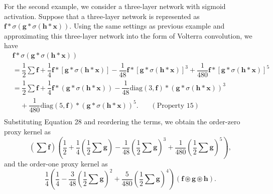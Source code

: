 \documentclass[twoside,11pt]{article}
\def\oconv{\circledast}
\def\diag{\text{diag}}
\def\tvar#1{\mathbf{#1}} %
\begin{document}
For the second example, we consider a three-layer network with sigmoid activation. Suppose that a three-layer network is represented as \(\tvar{f} * \sigma(\tvar{g} * \sigma(\tvar{h} * \tvar{x}))\).
Using the same settings as previous example and approximating this three-layer network into the form of Volterra convolution, we have
\begin{equation*}
  \begin{aligned}
     & \tvar{f} * \sigma(\tvar{g} * \sigma(\tvar{h} * \tvar{x}))                      \\
     & = \dfrac{1}{2} \sum \tvar{f}
    + \dfrac{1}{4} \tvar{f} * [\tvar{g} * \sigma(\tvar{h} * \tvar{x})]
    - \dfrac{1}{48} \tvar{f} * [\tvar{g} * \sigma(\tvar{h} * \tvar{x})]^{3}
    + \dfrac{1}{480} \tvar{f} * [\tvar{g} * \sigma(\tvar{h} * \tvar{x})]^{5}          \\
     & = \dfrac{1}{2} \sum \tvar{f}
    + \dfrac{1}{4} \tvar{f} * (\tvar{g} * \sigma(\tvar{h} * \tvar{x}))
    - \dfrac{1}{48} \diag(3, \tvar{f}) * (\tvar{g} * \sigma(\tvar{h} * \tvar{x}))^{3} \\
     & ~~~~~
    + \dfrac{1}{480} \diag(5, \tvar{f}) * (\tvar{g} * \sigma(\tvar{h} * \tvar{x}))^{5}.
    ~~~~~~~~ (\text{Property 15})
    \\
  \end{aligned}
\end{equation*}
Substituting Equation 28 %
and reordering the terms, we obtain the order-zero proxy kernel as
\begin{equation*}
  \left(\sum \tvar{f} \right)
  \left(
  \dfrac{1}{2}
  + \dfrac{1}{4} \left(\dfrac{1}{2} \sum \tvar{g}\right)
  - \dfrac{1}{48} \left(\dfrac{1}{2} \sum \tvar{g}\right)^3
  + \dfrac{1}{480} \left(\dfrac{1}{2} \sum \tvar{g}\right)^5
  \right),
\end{equation*}
and the order-one proxy kernel as
\begin{equation}
  \label{equ:three-layer-order-one-proxy-kernel}
  \dfrac{1}{4}
  \left(
  \dfrac{1}{4}
  - \dfrac{3}{48} \left(\dfrac{1}{2} \sum \tvar{g}\right)^2
  + \dfrac{5}{480} \left(\dfrac{1}{2} \sum \tvar{g}\right)^4
  \right)
  \left( \tvar{f} \oconv \tvar{g} \oconv \tvar{h} \right).
\end{equation}
\end{document}
